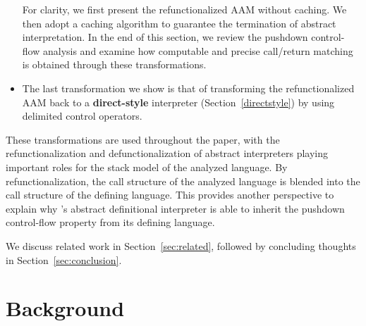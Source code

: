 \documentclass[acmsmall, review]{acmart}\settopmatter{}
\begin{document}
\begin{itemize}
    For clarity, we first present the refunctionalized AAM without caching. 
    We then adopt a caching algorithm \cite{darais2017abstracting} to guarantee the termination 
    of abstract interpretation.
    In the end of this section, we review the pushdown control-flow analysis and examine how 
    computable and precise call/return matching is obtained through these transformations.

  \item The last transformation we show is that of transforming the refunctionalized AAM back to a
    \textbf{direct-style} interpreter (Section~\ref{directstyle}) by using delimited control operators.
\end{itemize}

These transformations are used throughout the paper, with the refunctionalization and
defunctionalization of abstract interpreters playing important roles for the stack model of
the analyzed language. By refunctionalization, the call structure of the analyzed language
is blended into the call structure of the defining language. This provides another perspective to
explain why \citeauthor{darais2017abstracting}'s abstract definitional interpreter
is able to inherit the pushdown control-flow property from its defining language.

We discuss related work in Section~\ref{sec:related}, followed by
concluding thoughts in Section~\ref{sec:conclusion}.

\iffalse
\subsection{Style}

We use Scala language to demonstrate the idea and each step of transformations.
We expect that readers have moderate familiarity to Scala's syntax, such as
case classes, pattern matching and for comprehension.

There are two main reasons we use a real-world language:
1) The code does not diminish the accuracy of the material than formal and mathematical
notations, which are heavily used in other static analysis or semantics papers.
The Scala code in this paper can be easily back-translated into formal notations.
2) As a functional pearl, the code in this paper is executable with only few changes,
which make it particularly fit for presenting syntactic transformations on abstract
interpreters.
\fi

\section{Background} \label{background}
\end{document}
